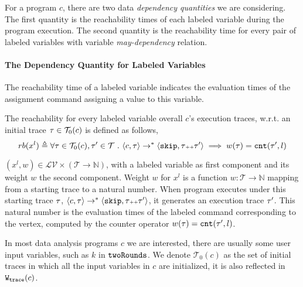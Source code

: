 For a program $c$, there are two data \emph{dependency quantities} we are considering.
The first quantity is the reachability times of each labeled variable during the program execution.
The second quantity is the reachability time for every pair of labeled variables with variable \emph{may-dependency} relation.
\paragraph{The Dependency Quantity for Labeled Variables}
The reachability time of a labeled variable indicates the evaluation times of the assignment command assigning a value to this variable.  
\begin{defn}
  \label{def:adapt-var_reachability}
The reachability for every labeled variable overall $c$'s execution traces,
w.r.t. an initial trace $\mathtt{\tau} \in \mathcal{T}_0(c)$ is defined as follows,
\[
  rb(x^l) \triangleq \forall \mathtt{\tau} \in \mathcal{T}_0(c), \mathtt{\tau}' \in \mathcal{T} ~.~ \langle {c}, \mathtt{\tau} \rangle \to^{*} \langle \mathtt{skip}, \mathtt{\tau}{\scriptscriptstyle ++}\mathtt{\tau}' \rangle 
  \implies w(\mathtt{\tau}) = \mathtt{cnt}(\mathtt{\tau}', l) 
  \]
\end{defn}
%
$(x^l, w) \in \mathcal{LV} \times (\mathcal{T} \to \mathbb{N})$,
with a labeled variable as first component and
its weight $w$ the second component.
Weight $w$ for
$x^l$ is a function $w : \mathcal{T} \to \mathbb{N}$
mapping from a starting trace to a natural number.
When program executes under this starting trace $\mathtt{\tau}$,
$\langle {c}, \mathtt{\tau} \rangle \to^{*} \langle \mathtt{skip}, \mathtt{\tau}{\scriptscriptstyle ++}\mathtt{\tau}' \rangle $, it generates an execution trace $\mathtt{\tau}'$.
This natural number is the evaluation times of the labeled command corresponding to the vertex, 
computed by the counter operator $w(\mathtt{\tau}) = \mathtt{cnt}(\mathtt{\tau}', l)$.


In most data analysis programs $c$ we are interested, there are usually some user input variables, such as $k$ in $\mathtt{twoRounds}$. 
We denote $\mathcal{T}_0(c)$ as the set of initial traces in which all the input variables in $c$ are initialized, it is also reflected in $\mathtt{{W_{trace}}}({c})$.    
%
